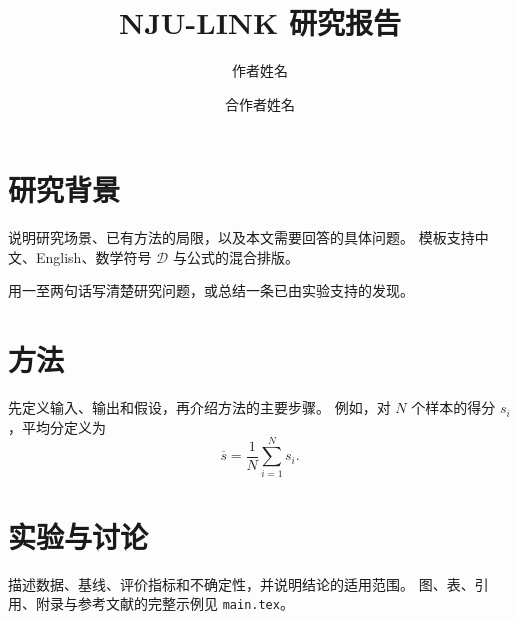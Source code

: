 \documentclass[10pt,chinese]{njulink}
\title{NJU-LINK 研究报告}
\author[1]{作者姓名}
\author[1]{合作者姓名}
\affiliation[1]{NJU-LINK}
\begin{document}
\maketitle

\section{研究背景}
说明研究场景、已有方法的局限，以及本文需要回答的具体问题。
模板支持中文、English、数学符号 $\mathcal{D}$ 与公式的混合排版。

\begin{njubox}[title={研究要点}]
用一至两句话写清楚研究问题，或总结一条已由实验支持的发现。
\end{njubox}

\section{方法}
先定义输入、输出和假设，再介绍方法的主要步骤。
例如，对 $N$ 个样本的得分 $s_i$，平均分定义为
\begin{equation}
  \overline{s}=\frac{1}{N}\sum_{i=1}^{N}s_i.
\end{equation}

\section{实验与讨论}
描述数据、基线、评价指标和不确定性，并说明结论的适用范围。
图、表、引用、附录与参考文献的完整示例见 \texttt{main.tex}。

% 
% 
\end{document}
